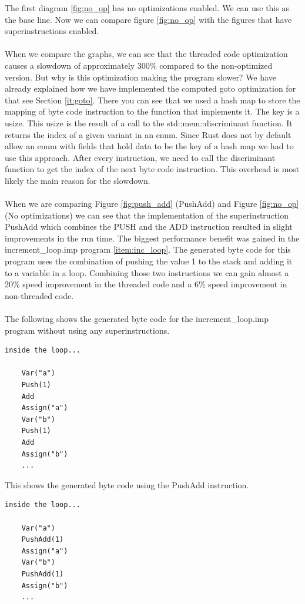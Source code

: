 \documentclass{article}
\begin{document}
The first diagram \ref{fig:no_op} has no optimizations enabled. We can use
this as the base line. Now we can compare figure \ref{fig:no_op} with
the figures that have superinstructions enabled.
\\\\
When we compare the graphs, we can see that the threaded code optimization
causes a slowdown of approximately 300\% compared to the non-optimized version.
But why is this optimization making the program slower? We have already
explained how we have implemented the computed goto optimization for that see
Section \ref{it:goto}. There you can see that we used a hash map to store the
mapping of byte code instruction to the function that implements it. The key is
a usize. This usize is the result of a call to the std::mem::discriminant
function. It returns the index of a given variant in an enum. Since Rust does
not by default allow an enum with fields that hold data to be the key of a hash
map we had to use this approach. After every instruction, we need to call the
discriminant function to get the index of the next byte code instruction. This
overhead is most likely the main reason for the slowdown. 
\\\\ 
When we are comparing Figure \ref{fig:push_add} (PushAdd) and Figure
\ref{fig:no_op} (No optimizations) we can see that the implementation of the
superinstruction PushAdd which combines the PUSH and the ADD instruction
resulted in slight improvements in the run time. The biggest performance
benefit was gained in the increment\_loop.imp program \ref{item:inc_loop}. The
generated byte code for this program uses the combination of pushing the value
1 to the stack and adding it to a variable in a loop. Combining those two
instructions we can gain almost a 20\% speed improvement in the threaded code
and a 6\% speed improvement in non-threaded code.
\\\\
The following shows the generated byte code for the increment\_loop.imp program
without using any superinstructions.
\begin{verbatim}
inside the loop...

    Var("a")
    Push(1)
    Add
    Assign("a")
    Var("b")
    Push(1)
    Add
    Assign("b")
    ...
\end{verbatim}

This shows the generated byte code using the PushAdd instruction.
\begin{verbatim}
inside the loop...

    Var("a")
    PushAdd(1)
    Assign("a")
    Var("b")
    PushAdd(1)
    Assign("b")
    ...
\end{verbatim}
\end{document}
